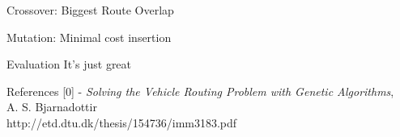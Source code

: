 \documentclass[ %
                    author={Callum Mann},
                     title={Genetic algorithm for the CVRP},
                  subtitle={Capacitated Vehicle Routing Problem},
                      type={Heuristic},
                      year={2016}]{poster}
\begin{document}
\begin{frame}{}
\begin{columns}[t]
\begin{column}{0.422\linewidth}
    \vfill

    \begin{block}{\Large Crossover: Biggest Route Overlap}
      \vspace{10cm}
    \end{block}
    \vspace{1cm}

    \begin{block}{\Large Mutation: Minimal cost insertion}
      \vspace{10cm}
    \end{block}
    \vspace{1cm}

    \begin{block}{\Large Evaluation}
      It's just great
    \end{block}

    \begin{block}{\Large References}
      [0] - \textit{Solving the Vehicle Routing Problem with Genetic Algorithms}, \\ A. S. Bjarnadottir \\
      http://etd.dtu.dk/thesis/154736/imm3183.pdf
    \end{block}
    \vspace{1cm}
  \end{column}
\end{columns}

\vfill

\end{frame}

\end{document}
